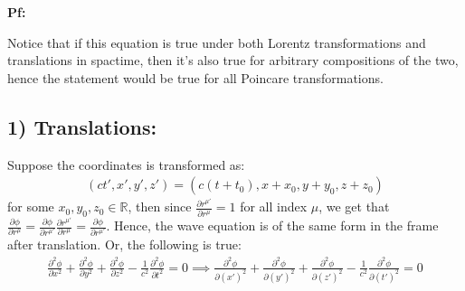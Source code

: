 \documentclass{article}
\newcommand{\RR}{\mathbb{R}}
\begin{document}
\textbf{Pf:}

Notice that if this equation is true under both Lorentz transformations and translations in spactime, then it's also true for arbitrary compositions of the two, hence the statement would be true for all Poincare transformations.

\subsection*{1) Translations:}
Suppose the coordinates is transformed as:
\begin{align}
    (ct', x', y', z') = (c(t+t_0), x+x_0, y+y_0, z+z_0)
\end{align}
for some $x_0,y_0,z_0\in\RR$, then since $\frac{\partial r^{\mu'}}{\partial r^\mu} = 1$ for all index $\mu$, we get that $\frac{\partial \phi}{\partial r^\mu} = \frac{\partial \phi}{\partial r^{\mu'}}\frac{\partial r^{\mu'}}{\partial r^\mu} = \frac{\partial \phi}{\partial r^{\mu'}}$. Hence, the wave equation is of the same form in the frame after translation. Or, the following is true:
\begin{align}
    \frac{\partial^2\phi}{\partial x^2}+\frac{\partial^2\phi}{\partial y^2}+\frac{\partial^2\phi}{\partial z^2}-\frac{1}{c^2}\frac{\partial^2\phi}{\partial t^2}=0 \implies \frac{\partial^2\phi}{\partial (x')^2}+\frac{\partial^2\phi}{\partial (y')^2}+\frac{\partial^2\phi}{\partial (z')^2}-\frac{1}{c^2}\frac{\partial^2\phi}{\partial (t')^2}=0
\end{align}
\end{document}
